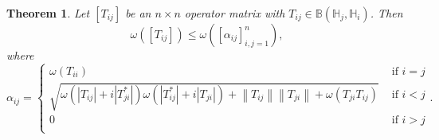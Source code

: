 \documentclass[12pt,twoside,reqno]{amsart}
\newtheorem{theorem}{Theorem}[section]
\numberwithin{equation}{section}
\begin{document}
\begin{theorem}\label{5}
Let $\left[ {{T}_{ij}} \right]$ be an $n\times n$ operator matrix with ${{T}_{ij}}\in \mathbb B\left( {{\mathbb H}_{j}},{{\mathbb H}_{i}} \right)$. Then
\[\omega \left( \left[ {{T}_{ij}} \right] \right)\le \omega \left( \left[ {{\alpha }_{ij}} \right]_{i,j=1}^{n} \right),\]
where
\begin{equation*}
{{\alpha }_{ij}}=\left\{ \begin{array}{ll}
   \omega \left( {{T}_{ii}} \right)&\text{ if }i=j \\ 
  \sqrt{\omega \left( \left| {{T}_{ij}} \right|+i\left| T_{ji}^{*} \right| \right)\omega \left( \left| T_{ij}^{*} \right|+i\left| {{T}_{ji}} \right| \right)+\left\| {{T}_{ij}} \right\|\left\| {{T}_{ji}} \right\|+\omega \left( {{T}_{ji}}{{T}_{ij}} \right)}&\text{ if }i<j \\ 
  0&\text{ if }i>j \\ 
\end{array} \right..
\end{equation*}
\end{theorem}
\end{document}
